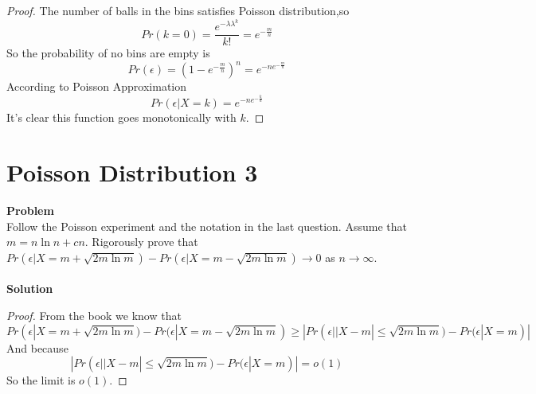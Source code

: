 		\begin{proof}
			The number of balls in the bins satisfies Poisson distribution,so
	\begin{equation*}
		Pr(k=0)=\frac{e^{-\lambda \lambda^k}}{k!}=e^{-\frac{m}{n}}
	\end{equation*}
	So the probability of no bins are empty is
	\begin{equation*}
		Pr(\epsilon)=\left(1-e^{-\frac{m}{n}}\right)^n=e^{-ne^{-\frac{m}{n}}}
	\end{equation*}
	According to Poisson Approximation
	\begin{equation*}
		Pr(\epsilon|X=k)=e^{-ne^{-\frac{k}{n}}}
	\end{equation*}
	It's clear this function goes monotonically with $k$.
		\end{proof}

	
	\section{Poisson Distribution 3}
	\textbf{Problem}\\
	Follow the Poisson experiment and the notation in the last question. Assume that $m=n\ln n +cn$. Rigorously prove that $Pr(\epsilon|X=m+\sqrt{2m\ln m})-Pr(\epsilon|X=m-\sqrt{2m\ln m}) \rightarrow 0$ as $n \rightarrow \infty$.\\\\
	\textbf{Solution}\\
	\begin{proof}
		From the book we know that
	\begin{equation*}
		Pr(\epsilon|X=m+\sqrt{2m\ln m})-Pr(\epsilon|X=m-\sqrt{2m\ln m}) \geq |Pr(\epsilon||X-m|\leq \sqrt{2m\ln m})-Pr(\epsilon|X=m)|
	\end{equation*}
	And because
	\begin{equation*}
		|Pr(\epsilon||X-m|\leq \sqrt{2m\ln m})-Pr(\epsilon|X=m)|=o(1)
	\end{equation*}
	So the limit is $o(1)$.
	\end{proof}
	
